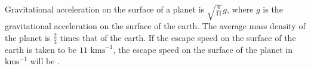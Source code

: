 
\item Gravitational acceleration on the surface of a planet is $\sqrt{\frac{6}{11}} g$, where $g$ is the gravitational acceleration on the surface of the earth. The average mass density of the planet is $\frac{2}{3}$ times that of the earth. If the escape speed on the surface of the earth is taken to be $11 \text{ kms}^{-1}$, the escape speed on the surface of the planet in $\text{kms}^{-1}$ will be \underline{\hspace{2.5cm}}.
